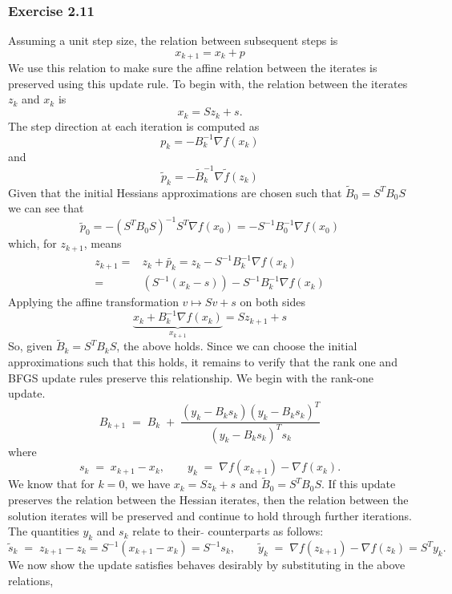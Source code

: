 \subsubsection{Exercise 2.11}
Assuming a unit step size, the relation between subsequent steps is
\[
    x_{k+1} = x_k + p
\]
We use this relation to make sure the affine relation between the iterates is preserved using this update rule.
To begin with, the relation between the iterates $z_k$ and $x_k$ is
\[
    x_k = Sz_k + s.
\]
The step direction at each iteration is computed as
\[
    p_k = -B_k^{-1}\nabla f(x_k)
\]
and
\[
    \tilde{p}_k = -\tilde{B}_k^{-1}\nabla \tilde{f}(z_k)
\]
Given that the initial Hessians approximations are chosen such that $\tilde{B}_0 = S^TB_0S$ we can see that
\[
    \tilde{p}_0 =  -(S^TB_0S)^{-1}S^T\nabla f(x_0) = -S^{-1}B_0^{-1}\nabla f(x_0)
\]
which, for $z_{k+1}$, means
\begin{align*}
    z_{k+1} = & z_k + \tilde{p_k} = z_k - S^{-1}B_k^{-1}\nabla f(x_k) \\
    =         & (S^{-1}(x_k - s)) - S^{-1}B_k^{-1}\nabla f(x_k)
\end{align*}
Applying the affine transformation $v \mapsto Sv +s$ on both sides
\[
    \underbrace{x_k + B_{k}^{-1}\nabla f(x_k)}_{x_{k+1}} = Sz_{k+1} + s
\]
So, given $\tilde{B}_k = S^TB_kS$, the above holds.
Since we can choose the initial approximations such that this holds, it remains to verify that the rank one and BFGS update rules preserve this relationship.
We begin with the rank-one update.
\[
    B_{k+1} \;=\; B_k \;+\;
    \frac{(y_k - B_k s_k)(y_k - B_k s_k)^{T}}
    {(y_k - B_k s_k)^{T} s_k}
\]
where
\[
    s_k \;=\; x_{k+1} - x_k,
    \qquad
    y_k \;=\; \nabla f(x_{k+1}) - \nabla f(x_k).
\]
We know that for $k=0$, we have $x_k = Sz_k +s$ and $\tilde{B}_0 = S^TB_0S$.
If this update preserves the relation between the Hessian iterates, then the relation between the solution iterates will be preserved and continue to hold through further iterations.
The quantities $y_k$ and $s_k$ relate to their $\tilde{}$ counterparts as follows:
\[
    \tilde{s}_k \;=\; z_{k+1} - z_k = S^{-1}(x_{k+1} -x_k) = S^{-1}s_k,
    \qquad
    \tilde{y}_k \;=\; \nabla f(z_{k+1}) - \nabla f(z_k) = S^Ty_k.
\]
We now show the update satisfies behaves desirably by substituting in the above relations,
